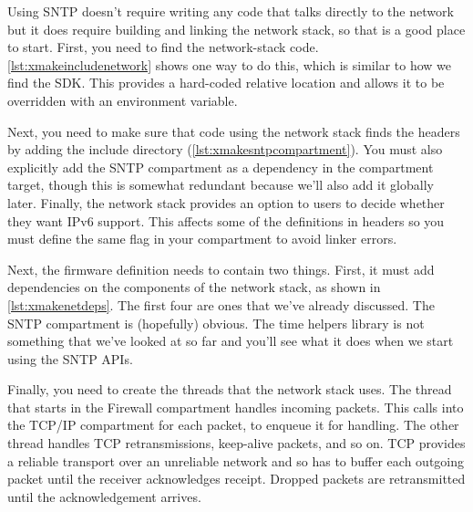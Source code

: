 Using SNTP doesn't require writing any code that talks directly to the network but it does require building and linking the network stack, so that is a good place to start.
First, you need to find the network-stack code.
\ref{lst:xmakeincludenetwork} shows one way to do this, which is similar to how we find the SDK.
This provides a hard-coded relative location and allows it to be overridden with an environment variable.

\lualisting[filename=examples/sntp/xmake.lua,marker=include_network,label=lst:xmakeincludenetwork,caption="Build system code for including the network stack."]{}

Next, you need to make sure that code using the network stack finds the headers by adding the include directory (\ref{lst:xmakesntpcompartment}).
You must also explicitly add the SNTP compartment as a dependency in the compartment target, though this is somewhat redundant because we'll also add it globally later.
Finally, the network stack provides an option to users to decide whether they want IPv6 support.
This affects some of the definitions in headers so you must define the same flag in your compartment to avoid linker errors.

\lualisting[filename=examples/sntp/xmake.lua,marker=sntp,label=lst:xmakesntpcompartment,caption="Build system code for building a compartment that uses the network stack."]{}

Next, the firmware definition needs to contain two things.
First, it must add dependencies on the components of the network stack, as shown in \ref{lst:xmakenetdeps}.
The first four are ones that we've already discussed.
The SNTP compartment is (hopefully) obvious.
The time helpers library is not something that we've looked at so far and you'll see what it does when we start using the SNTP APIs.

\lualisting[filename=examples/sntp/xmake.lua,marker=network_stack_deps,label=lst:xmakenetdeps,caption="Build system code for adding dependencies on the network stack."]{}

Finally, you need to create the threads that the network stack uses.
The thread that starts in the Firewall compartment handles incoming packets.
This calls into the TCP/IP compartment for each packet, to enqueue it for handling.
The other thread handles TCP retransmissions, keep-alive packets, and so on.
TCP provides a reliable transport over an unreliable network and so has to buffer each outgoing packet until the receiver acknowledges receipt.
Dropped packets are retransmitted until the acknowledgement arrives.

